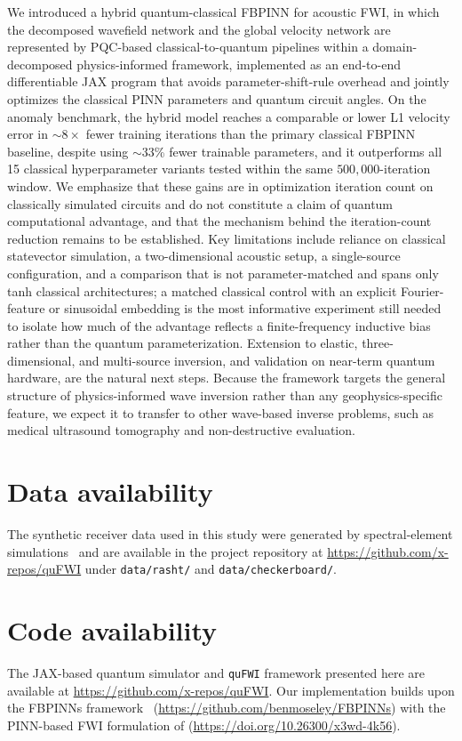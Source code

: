 \documentclass[11pt,a4paper]{article}
\begin{document}
We introduced a hybrid quantum-classical FBPINN for acoustic FWI, in which the decomposed wavefield network and the global velocity network are represented by PQC-based classical-to-quantum pipelines within a domain-decomposed physics-informed framework, implemented as an end-to-end differentiable JAX program that avoids parameter-shift-rule overhead and jointly optimizes the classical PINN parameters and quantum circuit angles. On the anomaly benchmark, the hybrid model reaches a comparable or lower L1 velocity error in $\sim$$8\times$ fewer training iterations than the primary classical FBPINN baseline, despite using $\sim$$33$\% fewer trainable parameters, and it outperforms all 15 classical hyperparameter variants tested within the same $500{,}000$-iteration window. We emphasize that these gains are in optimization iteration count on classically simulated circuits and do not constitute a claim of quantum computational advantage, and that the mechanism behind the iteration-count reduction remains to be established. Key limitations include reliance on classical statevector simulation, a two-dimensional acoustic setup, a single-source configuration, and a comparison that is not parameter-matched and spans only tanh classical architectures; a matched classical control with an explicit Fourier-feature or sinusoidal embedding is the most informative experiment still needed to isolate how much of the advantage reflects a finite-frequency inductive bias rather than the quantum parameterization. Extension to elastic, three-dimensional, and multi-source inversion, and validation on near-term quantum hardware, are the natural next steps. Because the framework targets the general structure of physics-informed wave inversion rather than any geophysics-specific feature, we expect it to transfer to other wave-based inverse problems, such as medical ultrasound tomography and non-destructive evaluation.


\section*{Data availability}
The synthetic receiver data used in this study were generated by spectral-element simulations~\citep{komatitsch1998spectral} and are available in the project repository at \url{https://github.com/x-repos/quFWI} under \texttt{data/rasht/} and \texttt{data/checkerboard/}.

\section*{Code availability}
The JAX-based quantum simulator and \texttt{quFWI} framework presented here are available at \url{https://github.com/x-repos/quFWI}. Our implementation builds upon the FBPINNs framework~\citep{Moseley2023} (\url{https://github.com/benmoseley/FBPINNs}) with the PINN-based FWI formulation of \citet{rahst} (\url{https://doi.org/10.26300/x3wd-4k56}).
\end{document}
